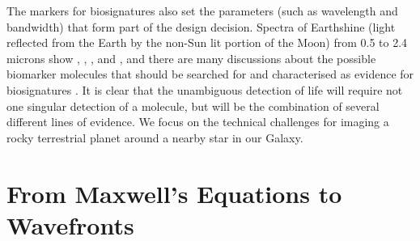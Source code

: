 \documentclass[letterpaper]{ar-1col}
\begin{document}
\begin{figure}[ht]
{%
}
  \label{fig:nstars}
\end{figure}

The markers for biosignatures also set the parameters (such as wavelength and bandwidth) that form part of the design decision.
%
Spectra of Earthshine (light reflected from the Earth by the non-Sun lit portion of the Moon) from 0.5 to 2.4 microns show , , ,  and  \citep{Turnbull06}, and there are many discussions about the possible biomarker molecules that should be searched for and characterised as evidence for biosignatures \citep[see the reviews of ][]{2016AsBio..16..465S,2017ARAA..55..433K,2018AsBio..18..663S}.
%
It is clear that the unambiguous detection of life will require not one singular detection of a molecule, but will be the combination of several different lines of evidence.
%
We focus on the technical challenges for imaging a rocky terrestrial planet around a nearby star in our Galaxy.

\section{From Maxwell's Equations to Wavefronts}\label{sec:maxwell}
\end{document}
